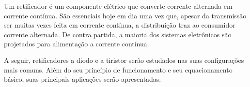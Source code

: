 
Um retificador é um componente elétrico que converte corrente alternada em corrente contínua. São essenciais hoje em dia uma vez que, apesar da transmissão ser muitas vezes feita em corrente contínua, a distribuição traz ao consumidor corrente alternada. De contra partida, a maioria dos sistemas eletrônicos são projetados para alimentação a corrente contínua.

A seguir, retificadores a diodo e a tiristor serão estudados nas suas configurações mais comuns. Além do seu princípio de funcionamento e seu equacionamento básico, suas principais aplicações serão apresentadas.

